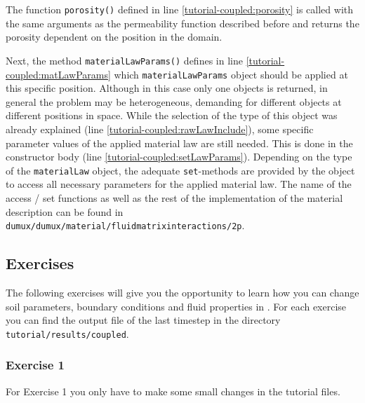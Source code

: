 The function \texttt{porosity()} defined in line
\ref{tutorial-coupled:porosity} is called with the same arguments as
the permeability function described before and returns the porosity
dependent on the position in the domain.

Next, the method \texttt{materialLawParams()} defines in line 
\ref{tutorial-coupled:matLawParams} which \verb+materialLawParams+ object 
 should be applied at this specific position. Although in this case only one objects is returned, 
in general the problem may be heterogeneous, demanding for different objects at different positions in space. 
While the selection of the type of this object was already explained (line \ref{tutorial-coupled:rawLawInclude}),
 some specific parameter 
values of the applied material law are still needed. This is 
done in the constructor body (line \ref{tutorial-coupled:setLawParams}).
Depending on the type of the \texttt{materialLaw} object, the adequate \texttt{set}-methods
are provided by the object to access all necessary parameters 
for the applied material law. The name of the access / set functions as well as the rest of the implementation 
of the material description can be found in 
\verb+dumux/dumux/material/fluidmatrixinteractions/2p+.

\subsection{Exercises}
\label{tutorial-coupled:exercises}
The following exercises will give you the opportunity to learn how you
can change soil parameters, boundary conditions and fluid properties
in \Dumux. For each exercise you can find the output file of the last
timestep in the directory \texttt{tutorial/results/coupled}.

\subsubsection{Exercise 1}
\renewcommand{\labelenumi}{\alph{enumi})} For Exercise 1 you only have
to make some small changes in the tutorial files.  

